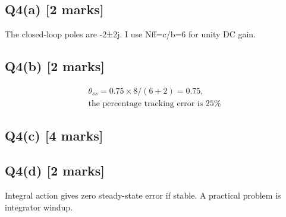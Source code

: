 \documentclass[11pt,a4paper]{article}
\begin{document}
\subsection*{Q4(a) \hfill [2 marks]}

The closed-loop poles are -2±2j.
I use Nff=c/b=6 for unity DC gain.

\subsection*{Q4(b) \hfill [2 marks]}

\[\begin{aligned}\theta_{ss} = 0.75\times8/(6+2)=0.75,\\ \text{the percentage tracking error is 25\%}\end{aligned}\]

\subsection*{Q4(c) \hfill [4 marks]}

\vspace{2mm}

\subsection*{Q4(d) \hfill [2 marks]}

Integral action gives zero steady-state error if stable.
A practical problem is integrator windup.
\end{document}

